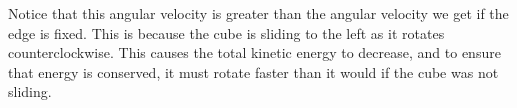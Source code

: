 \documentclass[10pt]{article}
\begin{document}
Notice that this angular velocity is greater than the angular velocity we get
if the edge is fixed.  This is because the cube is sliding to the left as it
rotates counterclockwise.  This causes the total kinetic energy to decrease, 
and to ensure that energy is conserved, it must rotate faster than it would
if the cube was not sliding.
\end{document}
